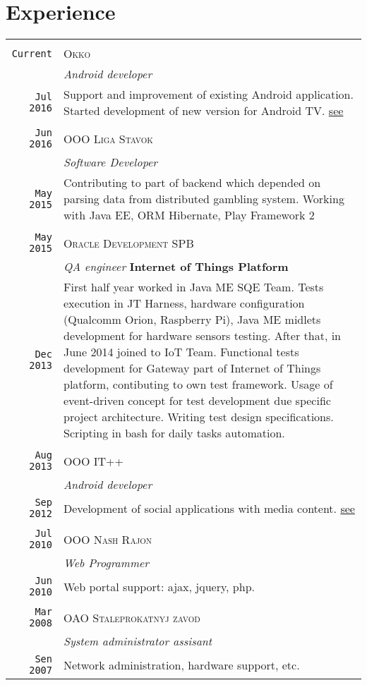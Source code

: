 \documentclass[a4paper,11pt]{article}
\begin{document}
\section{Experience}
	\begin{tabular}{r|p{11cm}}
                \multicolumn{2}{c}{} \\
		        \texttt{Current} &     \textsc{Okko}\\&                    	\emph{Android developer} \\
			\texttt{Jul 2016} & 	Support and improvement of existing Android application. Started development of new version for Android TV. \href{https://play.google.com/store/apps/details?id=ru.more.play}{see}\\
		\multicolumn{2}{c}{} \\
			\texttt{Jun 2016} &	\textsc{OOO Liga Stavok}\\&		\emph{Software Developer} \\
			\texttt{May 2015} & 	Contributing to part of backend which depended on parsing data from distributed gambling system. Working with Java EE, ORM Hibernate, Play Framework 2\\
		\multicolumn{2}{c}{} \\
			\texttt{May 2015} & 	\textsc{Oracle Development SPB} \\ & 	\emph{QA engineer} \textbf{Internet of Things Platform} \\
	  		\texttt{Dec 2013} & 	
	  			First half year worked in Java ME SQE Team. Tests execution in JT Harness, hardware configuration (Qualcomm Orion, Raspberry Pi), Java ME midlets development for hardware sensors testing. After that, in June 2014 joined to IoT Team.
				Functional tests development for Gateway part of Internet of Things platform, contibuting to own test framework. 
				Usage of event-driven concept for test development due specific project architecture. 
				Writing test design specifications. 
				Scripting in bash for daily tasks automation. \\
		\multicolumn{2}{c}{} \\
			\texttt{Aug 2013} &	\textsc{OOO IT++}\\&			\emph{Android developer} \\
			\texttt{Sep 2012} & Development of social applications with media content. \href{https://play.google.com/store/apps/dev?id=7316137962324369721}{see}\\
		\multicolumn{2}{c}{} \\
			\texttt{Jul 2010} & 	\textsc{OOO Nash Rajon}\\&		\emph{Web Programmer} \\
			\texttt{Jun 2010} & Web portal support: ajax, jquery, php.\\
		\multicolumn{2}{c}{} \\
			\texttt{Mar 2008} & 	\textsc{OAO Staleprokatnyj zavod}\\&	\emph{System administrator assisant}\\
			\texttt{Sen 2007} & Network administration, hardware support, etc.
	\end{tabular}
\end{document}
